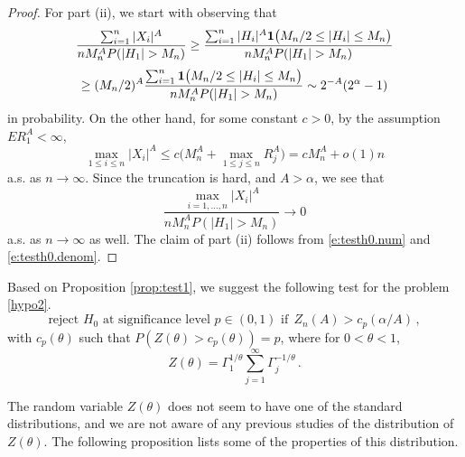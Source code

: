 \documentclass[11pt]{amsart}
\numberwithin{equation}{section}
\begin{document}
\begin{proof}
For part (ii), we start with observing that
\begin{equation} \label{e:testh0.num}
\frac{\sum_{i=1}^n|X_i|^A}{nM_n^A P(|H_1|>M_n)}
 \geq \frac{\sum_{i=1}^n|H_i|^A {{\bf 1}}\bigl(M_n/2\leq
|H_i|\le  M_n\bigr)}{nM_n^A P(|H_1|>M_n)}
\end{equation}
$$
\geq (M_n/2)^A \frac{\sum_{i=1}^n {{\bf 1}}\bigl(M_n/2\leq
|H_i|\le  M_n\bigr)}{nM_n^A P(|H_1|>M_n)} \sim 2^{-A}(2^\alpha-1)
$$
in probability. On the other hand, for some constant $c>0$, by the
assumption $ER_1^A<\infty$,
$$
\max_{1\le i\le n}|X_i|^A \leq c\bigl( M_n^A + \max_{1\leq j\leq
n}R_j^A\bigr) = cM_n^A + o(1)n
$$
a.s. as $n\to\infty$. Since the truncation is hard, and $A>\alpha$, we
see that
\begin{equation} \label{e:testh0.denom}
\frac{\max_{i=1,\ldots,n}|X_i|^A}{nM_n^A P(|H_1|>M_n)}\to 0
\end{equation}
a.s. as $n\to\infty$ as well. The claim of part (ii) follows from
\eqref{e:testh0.num} and \eqref{e:testh0.denom}.
\end{proof}

Based on Proposition \ref{prop:test1}, we suggest the following test
for the problem \eqref{hypo2}.
\begin{equation} \label{e:test.h0.formal}
\text{reject $H_0$ at significance level $p\in (0,1)$ if} \ \
Z_n(A) >c_p(\alpha/A)\,,
\end{equation}
with  $c_p(\theta)$  such that $P(Z(\theta)>c_p(\theta))=p$, where
for $0<\theta<1$,
\begin{equation} \label{e:test.stat.h0}
Z(\theta) =  \Gamma_1^{1/\theta}
\sum_{j=1}^\infty \Gamma_j^{-1/\theta}\,.
\end{equation}

The random variable $Z(\theta)$ does not seem to have one of the
standard distributions, and we are not aware of any previous studies
of the distribution of $Z(\theta)$. The following proposition lists
some of the properties of this distribution.
\end{document}
